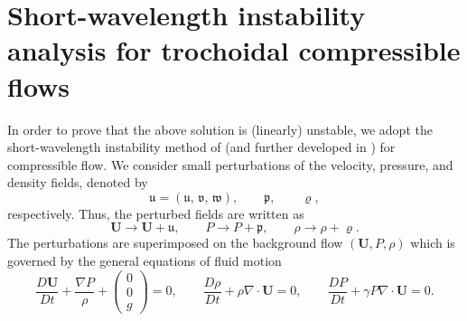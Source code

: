 \documentclass[reqno]{amsart}
\newcommand{\bu}{\mathbf{U}}             %
\begin{document}
\section{Short-wavelength instability analysis for trochoidal compressible flows}\label{Sec:instability}
In order to prove that the above solution is (linearly) unstable, we adopt the short-wavelength instability method of \cite{LH} (and further developed in \cite{LebovitzL}) for compressible flow. We consider small perturbations of the velocity, pressure, and density fields, denoted by
\[
\boldsymbol{\mathfrak{u}}
=(
\mathfrak{u},\,
\mathfrak{v},\,
\mathfrak{w}),
\qquad
\mathfrak{p},
\qquad
\varrho,
\]
respectively. Thus, the perturbed fields are written as
\begin{equation}
    \bu \rightarrow \bu+\boldsymbol{\mathfrak{u}},
    \qquad
    P\rightarrow P+\mathfrak{p},
    \qquad
    \rho\rightarrow \rho+\varrho.
\end{equation}
The perturbations are superimposed on the background flow $(\bu,P,\rho)$ which is 
governed by the general equations of fluid motion
\begin{equation}
    \frac{D\bu}{Dt}
    +\frac{\nabla P}{\rho}
    +\begin{pmatrix}
        0\\
        0\\
        g
    \end{pmatrix}
    =0,
    \qquad
    \frac{D\rho}{Dt}
    +\rho\nabla\cdot\bu
    =0,
    \qquad
    \frac{DP}{Dt}
    +\gamma P\nabla\cdot\bu
    =0.
\end{equation}
\end{document}
